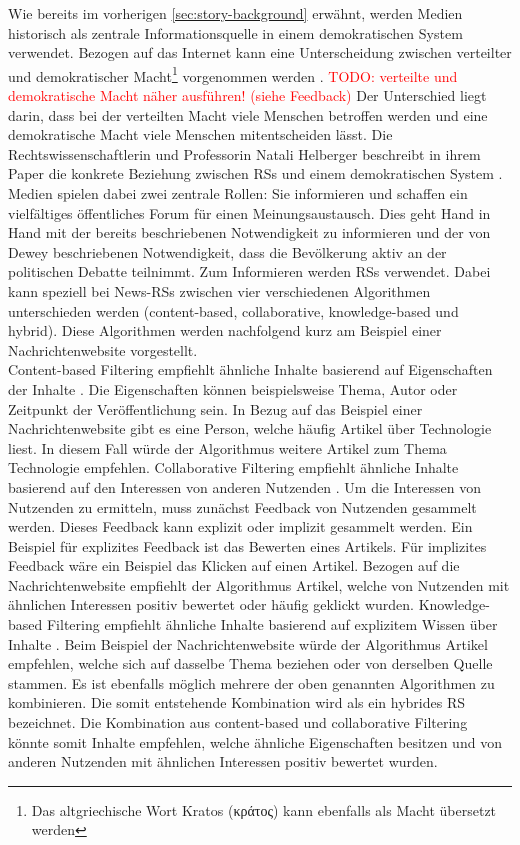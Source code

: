 Wie bereits im vorherigen \autoref{sec:story-background} erwähnt, werden Medien historisch als zentrale Informationsquelle in einem demokratischen System verwendet.
Bezogen auf das Internet kann eine Unterscheidung zwischen verteilter und demokratischer Macht\footnote{Das altgriechische Wort Kratos (\textgreek{κράτος}) kann ebenfalls als Macht übersetzt werden} vorgenommen werden \cite{free-speech-algorithmic}.
\textcolor{red}{TODO: verteilte und demokratische Macht näher ausführen! (siehe Feedback)}
Der Unterschied liegt darin, dass bei der verteilten Macht viele Menschen betroffen werden und eine demokratische Macht viele Menschen mitentscheiden lässt.
Die Rechtswissenschaftlerin und Professorin Natali Helberger beschreibt in ihrem Paper die konkrete Beziehung zwischen \acp{RS} und einem demokratischen System \cite{democratic-role}.
Medien spielen dabei zwei zentrale Rollen: Sie informieren und schaffen ein vielfältiges öffentliches Forum für einen Meinungsaustausch.
Dies geht Hand in Hand mit der bereits beschriebenen Notwendigkeit zu informieren und der von Dewey beschriebenen Notwendigkeit, dass die Bevölkerung aktiv an der politischen Debatte teilnimmt.
Zum Informieren werden \acp{RS} verwendet.
Dabei kann speziell bei News-\acp{RS} zwischen vier verschiedenen Algorithmen unterschieden werden (content-based, collaborative, knowledge-based und hybrid).
Diese Algorithmen werden nachfolgend kurz am Beispiel einer Nachrichtenwebsite vorgestellt. \\

Content-based Filtering empfiehlt ähnliche Inhalte basierend auf Eigenschaften der Inhalte \cite{content-based-rs}.
Die Eigenschaften können beispielsweise Thema, Autor oder Zeitpunkt der Veröffentlichung sein.
In Bezug auf das Beispiel einer Nachrichtenwebsite gibt es eine Person, welche häufig Artikel über Technologie liest.
In diesem Fall würde der Algorithmus weitere Artikel zum Thema Technologie empfehlen.
Collaborative Filtering empfiehlt ähnliche Inhalte basierend auf den Interessen von anderen Nutzenden \cite{collaborative-filtering-rs}.
Um die Interessen von Nutzenden zu ermitteln, muss zunächst Feedback von Nutzenden gesammelt werden.
Dieses Feedback kann explizit oder implizit gesammelt werden.
Ein Beispiel für explizites Feedback ist das Bewerten eines Artikels.
Für implizites Feedback wäre ein Beispiel das Klicken auf einen Artikel.
Bezogen auf die Nachrichtenwebsite empfiehlt der Algorithmus Artikel, welche von Nutzenden mit ähnlichen Interessen positiv bewertet oder häufig geklickt wurden.
Knowledge-based Filtering empfiehlt ähnliche Inhalte basierend auf explizitem Wissen über Inhalte \cite{knowledge-based-rs}.
Beim Beispiel der Nachrichtenwebsite würde der Algorithmus Artikel empfehlen, welche sich auf dasselbe Thema beziehen oder von derselben Quelle stammen.
Es ist ebenfalls möglich mehrere der oben genannten Algorithmen zu kombinieren.
Die somit entstehende Kombination wird als ein hybrides \ac{RS} bezeichnet.
Die Kombination aus content-based und collaborative Filtering könnte somit Inhalte empfehlen, welche ähnliche Eigenschaften besitzen und von anderen Nutzenden mit ähnlichen Interessen positiv bewertet wurden.\\

